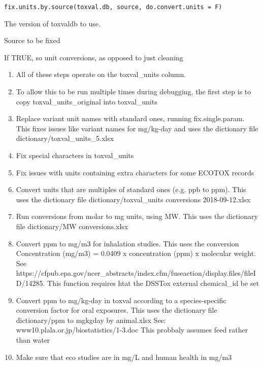 \documentclass[letterpaper]{book}
\begin{document}
%
\begin{Usage}
\begin{verbatim}
fix.units.by.source(toxval.db, source, do.convert.units = F)
\end{verbatim}
\end{Usage}
%
\begin{Arguments}
\begin{ldescription}
\item[\code{toxval.db}] The version of toxvaldb to use.

\item[\code{source}] Source to be fixed

\item[\code{do.convert.units}] If TRUE, so unit conversions, as opposed to just cleaning
\end{ldescription}
\end{Arguments}
%
\begin{Description}\relax
\begin{enumerate}

\item{} All of these steps operate on the toxval\_units column.
\item{} To allow this to be run multiple times during debugging, the first step
is to copy toxval\_units\_original into toxval\_units
\item{} Replace variant unit names with standard ones, running fix.single.param.
This fixes issues like variant names for mg/kg-day and uses the dictionary
file dictionary/toxval\_units\_5.xlsx
\item{} Fix special characters in toxval\_units
\item{} Fix issues with units containing extra characters for some ECOTOX records
\item{} Convert units that are multiples of standard ones (e.g. ppb to ppm). This
uses the dictionary file dictionary/toxval\_units conversions 2018-09-12.xlsx
\item{} Run conversions from molar to mg units, using MW. This uses the dictionary file
dictionary/MW conversions.xlsx
\item{} Convert ppm to mg/m3 for inhalation studies. This uses the conversion Concentration
(mg/m3) = 0.0409 x concentration (ppm) x molecular weight. See
https://cfpub.epa.gov/ncer\_abstracts/index.cfm/fuseaction/display.files/fileID/14285.
This function requires htat the DSSTox external chemical\_id be set
\item{} Convert ppm to mg/kg-day in toxval according to a species-specific
conversion factor for oral exposures. This uses the dictionary file
dictionary/ppm to mgkgday by animal.xlsx
See: www10.plala.or.jp/biostatistics/1-3.doc
This probbaly assumes feed rather than water
\item{} Make sure that eco studies are in mg/L and human health in mg/m3

\end{enumerate}

\end{Description}
\end{document}
